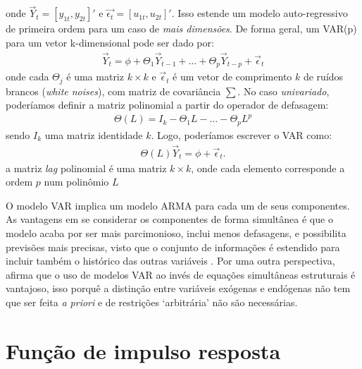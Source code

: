 \noindent
onde $\Vec{Y}_t=[ y_{1t}, y_{2t}]'$ e $\Vec{\epsilon_t}=[u_{1t}, u_{2t}]'$. Isso estende um modelo auto-regressivo de primeira ordem para um caso de \textit{mais dimensões}. De forma geral, um VAR(p) para um vetor k-dimensional pode ser dado por:
\begin{align*}
    \Vec{Y}_t = \phi + \Theta_1 \Vec{Y}_{t-1} + \dots + \Theta_p \Vec{Y}_{t-p} + \Vec{\epsilon}_t
\end{align*}
\noindent
onde cada $\Theta_j$ é uma matriz $k \times k$ e $\Vec{\epsilon}_t$ é um vetor de comprimento $k$ de ruídos brancos (\textit{white noises}), com matriz de covariância $\sum$. No caso \textit{univariado}, poderíamos definir a matriz polinomial a partir do operador de defasagem:
\begin{align*}
    \Theta(L) = I_k - \Theta_1 L - \dots - \Theta_p L^p
\end{align*}
\noindent
sendo $I_k$ uma matriz identidade $k$. Logo, poderíamos escrever o VAR como:
\begin{align*}
    \Theta(L)\Vec{Y}_t = \phi + \Vec{\epsilon}_t.
\end{align*}
\noindent
a matriz \textit{lag} polinomial é uma matriz $k \times k$, onde cada elemento corresponde a ordem $p$ num polinômio $L$

O modelo VAR implica um modelo ARMA para cada um de seus componentes. As vantagens em se considerar os componentes de forma simultânea é que o modelo acaba por ser mais parcimonioso, inclui menos defasagens, e possibilita previsões mais precisas, visto que o conjunto de informações é estendido para incluir também o histórico das outras variáveis \cite[p.322]{verbeek2008guide}. Por uma outra perspectiva,  afirma que o uso de modelos VAR ao invés de equações simultâneas estruturais é vantajoso, isso porquê a distinção entre variáveis exógenas e endógenas não tem que ser feita \textit{a priori} e de restrições `arbitrária' não são necessárias.    

\section{Função de impulso resposta} \label{respostaimpulso}

